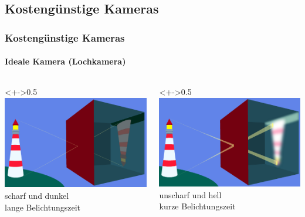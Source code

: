 \documentclass{beamer}
\begin{document}

\subsection[Kameras]{Kosteng\"unstige Kameras}


\begin{frame}
	\frametitle{Kosteng\"unstige Kameras}\framesubtitle{Ideale Kamera (Lochkamera)}
	\begin{columns}
		\begin{column}<+->{0.5\textwidth}
			\centering
			\includegraphics[width=1\textwidth]{bilder/lochkamera_scharf.PNG}\\
			scharf und dunkel \\lange Belichtungszeit
		\end{column}
		\begin{column}<+->{0.5\textwidth}
			\centering
			\includegraphics[width=1\textwidth]{bilder/lochkamera_unscharf.PNG}\\
			unscharf und hell \\kurze Belichtungszeit
		\end{column}
	\end{columns}
	\vskip28pt
	\footnotesize \color{gray}{Quelle: http://www.planet-schule.de/sf/multimedia-interaktive-\\
	\hskip30pt animationen-detail.php?projekt=lochkamera~(SWR/WDR~2011)}
\end{frame}
\end{document}
